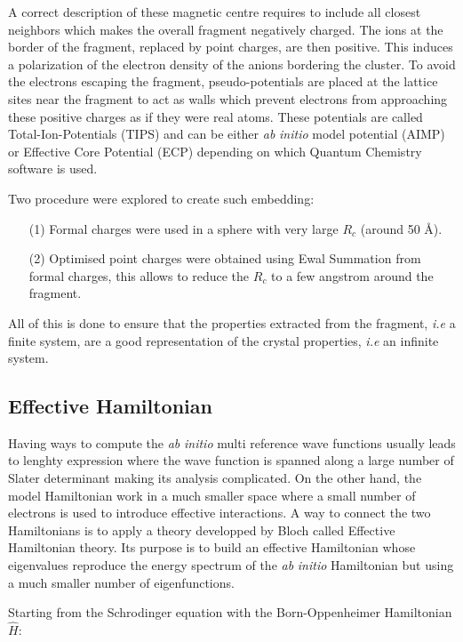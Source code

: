 \documentclass[10pt]{report}
\numberwithin{equation}{section}
\begin{document}
A correct description of these magnetic centre requires to include all closest neighbors which makes the overall fragment negatively charged.
The ions at the border of the fragment, replaced by point charges, are then positive. This induces a polarization of the electron density of the anions bordering the cluster.
To avoid the electrons escaping the fragment, pseudo-potentials are placed at the lattice sites near the fragment to act as walls which prevent electrons from approaching these positive charges as if they were real atoms.
These potentials are called Total-Ion-Potentials (TIPS) and can be either \textit{ab} \textit{initio} model potential (AIMP) or Effective Core Potential (ECP) depending on which Quantum Chemistry software is used.

Two procedure were explored to create such embedding:
\begin{itemize}
    \item[(1)] Formal charges were used in a sphere with very large $R_c$ (around 50 \AA{}).
    \item[(2)] Optimised point charges were obtained using Ewal Summation from formal charges, this allows to reduce the $R_c$ to a few angstrom around the fragment.
\end{itemize}

All of this is done to ensure that the properties extracted from the fragment, \textit{i.e} a finite system, are a good representation of the crystal properties, \textit{i.e} an infinite system.

\subsection{Effective Hamiltonian}

Having ways to compute the \textit{ab} \textit{initio} multi reference wave functions usually leads to lenghty expression where the wave function is spanned along a large number of Slater determinant making its analysis complicated.
On the other hand, the model Hamiltonian work in a much smaller space where a small number of electrons is used to introduce effective interactions.
A way to connect the two Hamiltonians is to apply a theory developped by Bloch called Effective Hamiltonian theory. 
Its purpose is to build an effective Hamiltonian whose eigenvalues reproduce the energy spectrum of the \textit{ab} \textit{initio} Hamiltonian but using a much smaller number of eigenfunctions.



Starting from the Schrodinger equation with the Born-Oppenheimer Hamiltonian $\hat{H}$:
\end{document}
